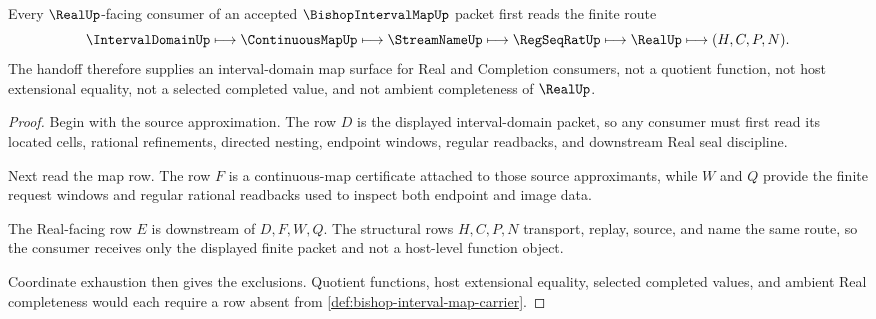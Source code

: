 \begin{theorem}
\label{thm:bishop-interval-map-real-handoff}
Every $\RealUp$-facing consumer of an accepted $\BishopIntervalMapUp$ packet first reads the finite route
$$
\IntervalDomainUp\longmapsto\ContinuousMapUp\longmapsto\StreamNameUp\longmapsto\RegSeqRatUp\longmapsto\RealUp\longmapsto(H,C,P,N).
$$
The handoff therefore supplies an interval-domain map surface for Real and Completion consumers, not a quotient function, not host extensional equality, not a selected completed value, and not ambient completeness of $\RealUp$.
\end{theorem}
\begin{proof}
Begin with the source approximation. The row $D$ is the displayed interval-domain packet, so any consumer must first read its located cells, rational refinements, directed nesting, endpoint windows, regular readbacks, and downstream Real seal discipline.

Next read the map row. The row $F$ is a continuous-map certificate attached to those source approximants, while $W$ and $Q$ provide the finite request windows and regular rational readbacks used to inspect both endpoint and image data.

The Real-facing row $E$ is downstream of $D,F,W,Q$. The structural rows $H,C,P,N$ transport, replay, source, and name the same route, so the consumer receives only the displayed finite packet and not a host-level function object.

Coordinate exhaustion then gives the exclusions. Quotient functions, host extensional equality, selected completed values, and ambient Real completeness would each require a row absent from \autoref{def:bishop-interval-map-carrier}.
\end{proof}


\begin{closurestatus}{\BishopIntervalMapUp}
  \theoryclosure{\seedClosure}
  \formalstatus{\unformalizedV}
\end{closurestatus}
